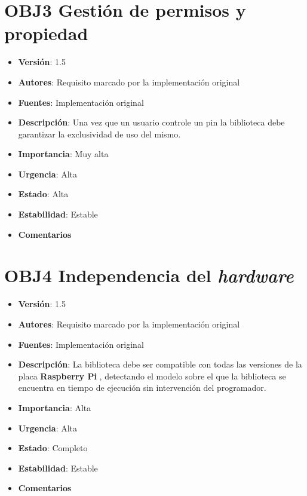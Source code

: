 \documentclass[letterpaper,10pt,spanish]{sphinxmanual}
\begin{document}
\section{\textbf{OBJ3} Gestión de permisos y propiedad}
\label{analysis/goals:obj3-gestion-de-permisos-y-propiedad}\begin{itemize}
\item {} 
\textbf{Versión}: 1.5

\item {} 
\textbf{Autores}: Requisito marcado por la implementación original

\item {} 
\textbf{Fuentes}: Implementación original

\item {} 
\textbf{Descripción}: Una vez que un usuario controle un pin la biblioteca debe garantizar la exclusividad de uso del mismo.

\item {} 
\textbf{Importancia}: Muy alta

\item {} 
\textbf{Urgencia}: Alta

\item {} 
\textbf{Estado}: Alta

\item {} 
\textbf{Estabilidad}: Estable

\item {} 
\textbf{Comentarios}

\end{itemize}


\section{\textbf{OBJ4} Independencia del \emph{hardware}}
\label{analysis/goals:obj4-independencia-del-hardware}\begin{itemize}
\item {} 
\textbf{Versión}: 1.5

\item {} 
\textbf{Autores}: Requisito marcado por la implementación original

\item {} 
\textbf{Fuentes}: Implementación original

\item {} 
\textbf{Descripción}: La biblioteca debe ser compatible con todas las versiones de la placa \textbf{Raspberry Pi} , detectando el modelo sobre el que la biblioteca se encuentra en tiempo de ejecución sin intervención del programador.

\item {} 
\textbf{Importancia}: Alta

\item {} 
\textbf{Urgencia}: Alta

\item {} 
\textbf{Estado}: Completo

\item {} 
\textbf{Estabilidad}: Estable

\item {} 
\textbf{Comentarios}

\end{itemize}
\end{document}
